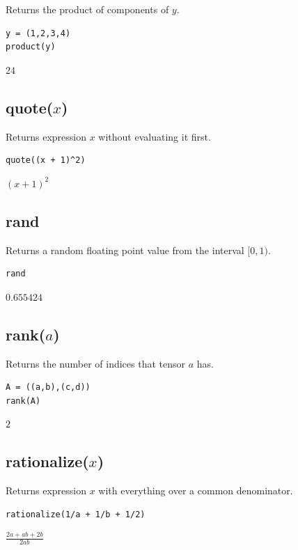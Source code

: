 \documentclass[12pt]{article}
\begin{document}
Returns the product of components of $y$.

{\color{blue}
\begin{verbatim}
y = (1,2,3,4)
product(y)
\end{verbatim}
}

$24$

\subsection*{quote($x$)}

Returns expression $x$ without evaluating it first.

{\color{blue}
\begin{verbatim}
quote((x + 1)^2)
\end{verbatim}
}

$\displaystyle (x+1)^2$

\subsection*{rand}

Returns a random floating point value from the interval $[0,1)$.

{\color{blue}
\begin{verbatim}
rand
\end{verbatim}
}

$0.655424$

\subsection*{rank($a$)}

Returns the number of indices that tensor $a$ has.

{\color{blue}
\begin{verbatim}
A = ((a,b),(c,d))
rank(A)
\end{verbatim}
}

$2$

\subsection*{rationalize($x$)}

Returns expression $x$ with everything over a common denominator.

{\color{blue}
\begin{verbatim}
rationalize(1/a + 1/b + 1/2)
\end{verbatim}
}

$\displaystyle \frac{2a+ab+2b}{2ab}$
\end{document}
